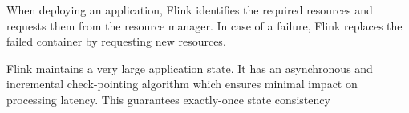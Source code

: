 When deploying an application, Flink identifies the required resources and requests them from the resource manager. In case of a failure, Flink replaces the failed container by requesting new resources. 

Flink maintains a very large application state. It has an asynchronous and incremental check-pointing algorithm which ensures minimal impact on processing latency. 
This guarantees exactly-once state consistency

